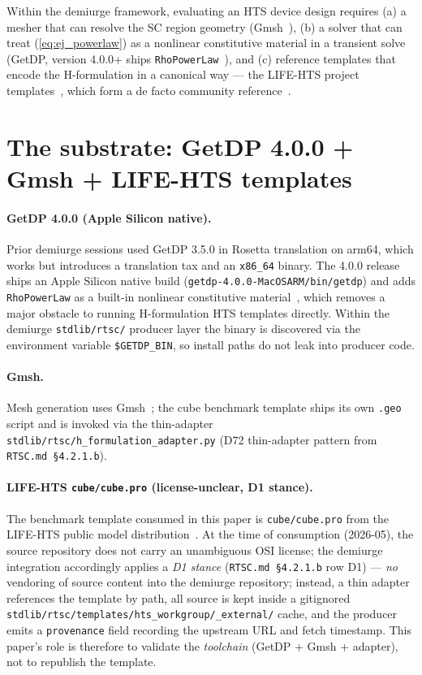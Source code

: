\documentclass[11pt,a4paper]{article}
\begin{document}
Within the demiurge framework, evaluating an HTS device design
requires (a) a mesher that can resolve the SC region geometry
(Gmsh~\cite{gmsh}), (b) a solver that can treat
(\ref{eq:ej_powerlaw}) as a nonlinear constitutive material in a
transient solve (GetDP, version 4.0.0+ ships
\texttt{RhoPowerLaw}~\cite{getdp}), and (c) reference templates that
encode the H-formulation in a canonical way --- the LIFE-HTS project
templates~\cite{life_hts}, which form a de facto community
reference~\cite{pecher_sirois}.

\section{The substrate: GetDP 4.0.0 + Gmsh + LIFE-HTS templates}
\label{sec:substrate}

\paragraph{GetDP 4.0.0 (Apple Silicon native).}
Prior demiurge sessions used GetDP 3.5.0 in Rosetta translation on
arm64, which works but introduces a translation tax and an
\texttt{x86\_64} binary. The 4.0.0 release ships an Apple Silicon
native build (\texttt{getdp-4.0.0-MacOSARM/bin/getdp}) and adds
\texttt{RhoPowerLaw} as a built-in nonlinear constitutive
material~\cite{getdp}, which removes a major obstacle to running
H-formulation HTS templates directly. Within the demiurge
\texttt{stdlib/rtsc/} producer layer the binary is discovered via the
environment variable \texttt{\$GETDP\_BIN}, so install paths do not
leak into producer code.

\paragraph{Gmsh.} Mesh generation uses
Gmsh~\cite{gmsh}; the cube benchmark template ships its own
\texttt{.geo} script and is invoked via the thin-adapter
\texttt{stdlib/rtsc/h\_formulation\_adapter.py} (D72 thin-adapter
pattern from \texttt{RTSC.md \S4.2.1.b}).

\paragraph{LIFE-HTS \texttt{cube/cube.pro} (license-unclear, D1 stance).}
The benchmark template consumed in this paper is
\texttt{cube/cube.pro} from the LIFE-HTS public model
distribution~\cite{life_hts}. At the time of consumption (2026-05),
the source repository does not carry an unambiguous OSI license; the
demiurge integration accordingly applies a \emph{D1 stance}
(\texttt{RTSC.md \S4.2.1.b} row D1) --- \emph{no} vendoring of source
content into the demiurge repository; instead, a thin adapter
references the template by path, all source is kept inside a
gitignored \texttt{stdlib/rtsc/templates/hts\_workgroup/\_external/}
cache, and the producer emits a \texttt{provenance} field recording
the upstream URL and fetch timestamp. This paper's role is therefore
to validate the \emph{toolchain} (GetDP + Gmsh + adapter), not to
republish the template.
\end{document}
